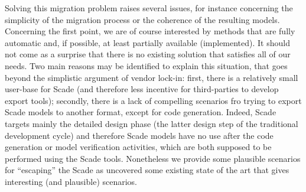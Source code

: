 \documentclass{template/openetcs_report}
\begin{document}
Solving this migration problem raises several issues, for instance
concerning the simplicity of the migration process or the coherence of
the resulting models. Concerning the first point, we are of course
interested by methods that are fully automatic and, if possible, at
least partially available (implemented). It should not come as a
surprise that there is no existing solution that satisfies all of our
needs. Two main reasons may be identified to explain this situation,
that goes beyond the simplistic argument of vendor lock-in: first,
there is a relatively small user-base for Scade (and therefore less
incentive for third-parties to develop export tools); secondly, there
is a lack of compelling scenarios fro trying to export Scade models to
another format, except for code generation. Indeed, Scade targets
mainly the detailed design phase (the latter design step of the
traditional development cycle) and therefore Scade models have no use
after the code generation or model verification activities, which are
both supposed to be performed using the Scade tools.  Nonetheless we
provide some plausible scenarios for ``escaping'' the Scade as
uncovered some existing state of the art that gives interesting (and
plausible) scenarios.







\end{document}

